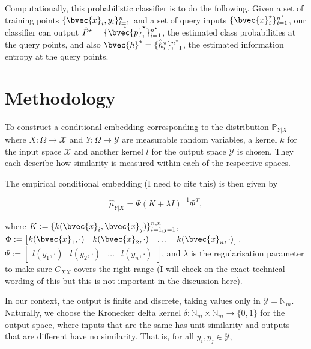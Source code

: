 \documentclass[a4paper, 12pt]{article}
\begin{document}
	Computationally, this probabilistic classifier is to do the following. Given a set of training points $\{\bvec{x}_{i}, y_{i}\}_{i = 1}^{n}$ and a set of query inputs $\{\bvec{x}^{\star}_{i}\}_{i = 1}^{n^{\star}}$, our classifier can output $\hat{P}^{\star} = \{\hat{\bvec{p}}^{\star}_{i}\}_{i = 1}^{n^{\star}}$, the estimated class probabilities at the query points, and also $\bvec{h}^{\star} = \{\hat{h}^{\star}_{i}\}_{i = 1}^{n^{\star}}$, the estimated information entropy at the query points.
	
\section{Methodology}

	To construct a conditional embedding corresponding to the distribution $\mathbb{P}_{Y | X}$ where $X : \Omega \to \mathcal{X}$ and $Y: \Omega \to \mathcal{Y}$ are measurable random variables, a kernel $k$ for the input space $\mathcal{X}$ and another kernel $l$ for the output space $\mathcal{Y}$ is chosen. They each describe how similarity is measured within each of the respective spaces.
	
	The empirical conditional embedding (I need to cite this) is then given by
	
	\begin{equation}
		\hat{\mu}_{Y | X} = \Psi (K + \lambda I)^{-1} \Phi^{T},
	\end{equation}
	
	where $K := \{k(\bvec{x}_{i}, \bvec{x}_{j})\}_{i = 1, j = 1}^{n, n}$, $\Phi := \begin{bmatrix} k(\bvec{x}_{1}, \cdot) & k(\bvec{x}_{2}, \cdot) & \dots & k(\bvec{x}_{n}, \cdot) \end{bmatrix}$, $\Psi := \begin{bmatrix} l(y_{1}, \cdot) & l(y_{2}, \cdot) & \dots & l(y_{n}, \cdot) \end{bmatrix}$, and $\lambda$ is the regularisation parameter to make sure $C_{X X}$ covers the right range (I will check on the exact technical wording of this but this is not important in the discussion here).
	
	In our context, the output is finite and discrete, taking values only in $\mathcal{Y} = \mathbb{N}_{m}$. Naturally, we choose the Kronecker delta kernel $\delta : \mathbb{N}_{m} \times \mathbb{N}_{m} \to \{0, 1\}$ for the output space, where inputs that are the same has unit similarity and outputs that are different have no similarity. That is, for all $y_{i}, y_{j} \in \mathcal{Y}$,
	
\end{document}
